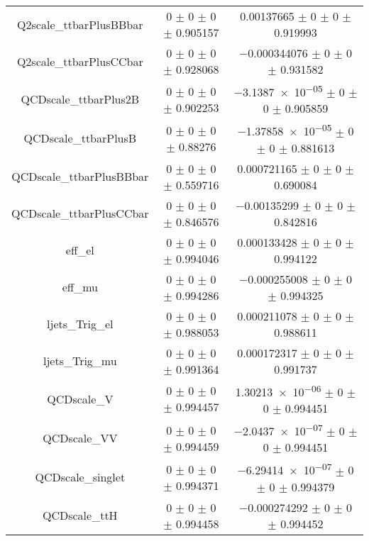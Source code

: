 \begin{table}
\begin{tabular}{ccc}
Q2scale\_ttbarPlusBBbar & \num{0} $\pm$ \num{0} $\pm$ \num{0} $\pm$ \num{0.905157} & \num{0.00137665} $\pm$ \num{0} $\pm$ \num{0} $\pm$ \num{0.919993}\\
Q2scale\_ttbarPlusCCbar & \num{0} $\pm$ \num{0} $\pm$ \num{0} $\pm$ \num{0.928068} & \num{-0.000344076} $\pm$ \num{0} $\pm$ \num{0} $\pm$ \num{0.931582}\\
QCDscale\_ttbarPlus2B & \num{0} $\pm$ \num{0} $\pm$ \num{0} $\pm$ \num{0.902253} & \num{-3.1387e-05} $\pm$ \num{0} $\pm$ \num{0} $\pm$ \num{0.905859}\\
QCDscale\_ttbarPlusB & \num{0} $\pm$ \num{0} $\pm$ \num{0} $\pm$ \num{0.88276} & \num{-1.37858e-05} $\pm$ \num{0} $\pm$ \num{0} $\pm$ \num{0.881613}\\
QCDscale\_ttbarPlusBBbar & \num{0} $\pm$ \num{0} $\pm$ \num{0} $\pm$ \num{0.559716} & \num{0.000721165} $\pm$ \num{0} $\pm$ \num{0} $\pm$ \num{0.690084}\\
QCDscale\_ttbarPlusCCbar & \num{0} $\pm$ \num{0} $\pm$ \num{0} $\pm$ \num{0.846576} & \num{-0.00135299} $\pm$ \num{0} $\pm$ \num{0} $\pm$ \num{0.842816}\\
eff\_el & \num{0} $\pm$ \num{0} $\pm$ \num{0} $\pm$ \num{0.994046} & \num{0.000133428} $\pm$ \num{0} $\pm$ \num{0} $\pm$ \num{0.994122}\\
eff\_mu & \num{0} $\pm$ \num{0} $\pm$ \num{0} $\pm$ \num{0.994286} & \num{-0.000255008} $\pm$ \num{0} $\pm$ \num{0} $\pm$ \num{0.994325}\\
ljets\_Trig\_el & \num{0} $\pm$ \num{0} $\pm$ \num{0} $\pm$ \num{0.988053} & \num{0.000211078} $\pm$ \num{0} $\pm$ \num{0} $\pm$ \num{0.988611}\\
ljets\_Trig\_mu & \num{0} $\pm$ \num{0} $\pm$ \num{0} $\pm$ \num{0.991364} & \num{0.000172317} $\pm$ \num{0} $\pm$ \num{0} $\pm$ \num{0.991737}\\
QCDscale\_V & \num{0} $\pm$ \num{0} $\pm$ \num{0} $\pm$ \num{0.994457} & \num{1.30213e-06} $\pm$ \num{0} $\pm$ \num{0} $\pm$ \num{0.994451}\\
QCDscale\_VV & \num{0} $\pm$ \num{0} $\pm$ \num{0} $\pm$ \num{0.994459} & \num{-2.0437e-07} $\pm$ \num{0} $\pm$ \num{0} $\pm$ \num{0.994451}\\
QCDscale\_singlet & \num{0} $\pm$ \num{0} $\pm$ \num{0} $\pm$ \num{0.994371} & \num{-6.29414e-07} $\pm$ \num{0} $\pm$ \num{0} $\pm$ \num{0.994379}\\
QCDscale\_ttH & \num{0} $\pm$ \num{0} $\pm$ \num{0} $\pm$ \num{0.994458} & \num{-0.000274292} $\pm$ \num{0} $\pm$ \num{0} $\pm$ \num{0.994452}\\

\end{tabular}
\end{table}
